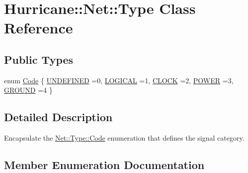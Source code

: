\hypertarget{classHurricane_1_1Net_1_1Type}{}\section{Hurricane\+:\+:Net\+:\+:Type Class Reference}
\label{classHurricane_1_1Net_1_1Type}
\subsection*{Public Types}
\begin{DoxyCompactItemize}
\item 
enum \mbox{\hyperlink{classHurricane_1_1Net_1_1Type_a2652e3299403e0f5979a848b267163a5}{Code}} \{ \newline
\mbox{\hyperlink{classHurricane_1_1Net_1_1Type_a2652e3299403e0f5979a848b267163a5a973ba9d650b909a277813926d7ec4f96}{U\+N\+D\+E\+F\+I\+N\+ED}} =0, 
\newline
\mbox{\hyperlink{classHurricane_1_1Net_1_1Type_a2652e3299403e0f5979a848b267163a5a8f454d4a48d8dbdd7d6341e7285b4a35}{L\+O\+G\+I\+C\+AL}} =1, 
\newline
\mbox{\hyperlink{classHurricane_1_1Net_1_1Type_a2652e3299403e0f5979a848b267163a5a94d77dd6484c8f8524a3960d42d3974b}{C\+L\+O\+CK}} =2, 
\newline
\mbox{\hyperlink{classHurricane_1_1Net_1_1Type_a2652e3299403e0f5979a848b267163a5a0b7ce81772b3f4df72edb083a52b2748}{P\+O\+W\+ER}} =3, 
\newline
\mbox{\hyperlink{classHurricane_1_1Net_1_1Type_a2652e3299403e0f5979a848b267163a5a87f5f36bbfcfac211f3dff73a8e46e65}{G\+R\+O\+U\+ND}} =4
 \}
\end{DoxyCompactItemize}


\subsection{Detailed Description}
Encapsulate the \mbox{\hyperlink{classHurricane_1_1Net_1_1Type_a2652e3299403e0f5979a848b267163a5}{Net\+::\+Type\+::\+Code}} enumeration that defines the signal category. 

\subsection{Member Enumeration Documentation}
\mbox{\label{classHurricane_1_1Net_1_1Type_a2652e3299403e0f5979a848b267163a5}} 
